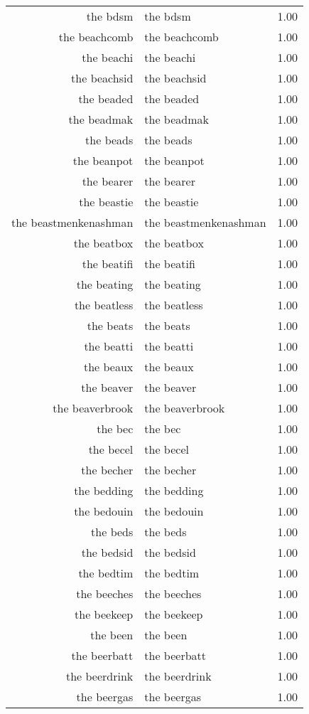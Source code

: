 \begin{table}[ht]
\begin{tabular}{rlr}
  the bdsm & the bdsm & 1.00 \\ 
  the beachcomb & the beachcomb & 1.00 \\ 
  the beachi & the beachi & 1.00 \\ 
  the beachsid & the beachsid & 1.00 \\ 
  the beaded & the beaded & 1.00 \\ 
  the beadmak & the beadmak & 1.00 \\ 
  the beads & the beads & 1.00 \\ 
  the beanpot & the beanpot & 1.00 \\ 
  the bearer & the bearer & 1.00 \\ 
  the beastie & the beastie & 1.00 \\ 
  the beastmenkenashman & the beastmenkenashman & 1.00 \\ 
  the beatbox & the beatbox & 1.00 \\ 
  the beatifi & the beatifi & 1.00 \\ 
  the beating & the beating & 1.00 \\ 
  the beatless & the beatless & 1.00 \\ 
  the beats & the beats & 1.00 \\ 
  the beatti & the beatti & 1.00 \\ 
  the beaux & the beaux & 1.00 \\ 
  the beaver & the beaver & 1.00 \\ 
  the beaverbrook & the beaverbrook & 1.00 \\ 
  the bec & the bec & 1.00 \\ 
  the becel & the becel & 1.00 \\ 
  the becher & the becher & 1.00 \\ 
  the bedding & the bedding & 1.00 \\ 
  the bedouin & the bedouin & 1.00 \\ 
  the beds & the beds & 1.00 \\ 
  the bedsid & the bedsid & 1.00 \\ 
  the bedtim & the bedtim & 1.00 \\ 
  the beeches & the beeches & 1.00 \\ 
  the beekeep & the beekeep & 1.00 \\ 
  the been & the been & 1.00 \\ 
  the beerbatt & the beerbatt & 1.00 \\ 
  the beerdrink & the beerdrink & 1.00 \\ 
  the beergas & the beergas & 1.00 \\ 

\end{tabular}
\end{table}
